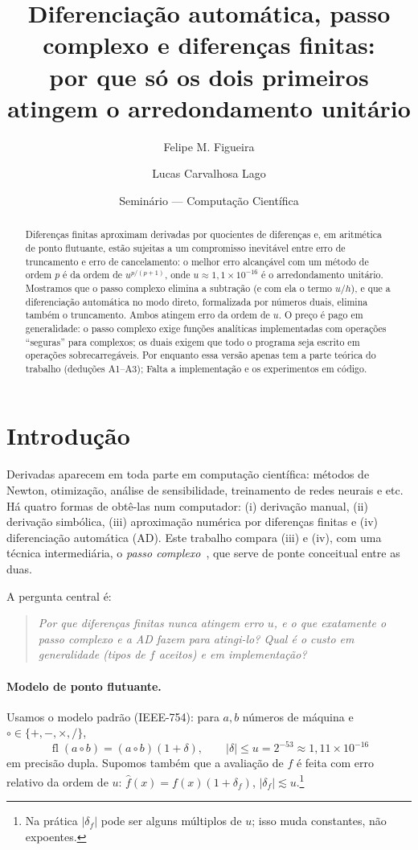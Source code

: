 \documentclass[11pt,a4paper]{article}
\title{Diferenciação automática, passo complexo e diferenças finitas:\\
\large por que só os dois primeiros atingem o arredondamento unitário\\[4pt] \normalsize }
\author{Felipe M. Figueira \and Lucas Carvalhosa Lago}
\date{\small Seminário --- Computação Científica}
\newcommand{\fl}{\operatorname{fl}}
\begin{document}
\maketitle

\begin{abstract}
Diferenças finitas aproximam derivadas por quocientes de diferenças e, em aritmética de ponto flutuante, estão sujeitas a um compromisso inevitável entre erro de truncamento e erro de cancelamento: o melhor erro alcançável com um método de ordem $p$ é da ordem de $u^{p/(p+1)}$, onde $u\approx1{,}1\times10^{-16}$ é o arredondamento unitário. Mostramos que o passo complexo elimina a subtração (e com ela o termo $u/h$), e que a diferenciação automática no modo direto, formalizada por números duais, elimina também o truncamento. Ambos atingem erro da ordem de $u$. O preço é pago em generalidade: o passo complexo exige funções analíticas implementadas com operações ``seguras'' para complexos; os duais exigem que todo o programa seja escrito em operações sobrecarregáveis. Por enquanto essa versão apenas tem a parte teórica do trabalho (deduções A1--A3); Falta a implementação e os experimentos em código.
\end{abstract}

\tableofcontents

\section{Introdução}

Derivadas aparecem em toda parte em computação científica: métodos de Newton, otimização, análise de sensibilidade, treinamento de redes neurais e etc. Há quatro formas de obtê-las num computador: (i) derivação manual, (ii) derivação simbólica, (iii) aproximação numérica por diferenças finitas e (iv) diferenciação automática (AD). Este trabalho compara (iii) e (iv), com uma técnica intermediária, o \emph{passo complexo}~\cite{squire1998,martins2003}, que serve de ponte conceitual entre as duas.

A pergunta central é:

\begin{quote}
\emph{Por que diferenças finitas nunca atingem erro $u$, e o que exatamente o passo complexo e a AD fazem para atingi-lo? Qual é o custo em generalidade (tipos de $f$ aceitos) e em implementação?}
\end{quote}

\paragraph{Modelo de ponto flutuante.} Usamos o modelo padrão (IEEE-754): para $a,b$ números de máquina e $\circ\in\{+,-,\times,/\}$,
\begin{equation}
\fl(a\circ b) = (a\circ b)(1+\delta), \qquad |\delta|\le u = 2^{-53}\approx 1{,}11\times 10^{-16}
\end{equation}
em precisão dupla. Supomos também que a avaliação de $f$ é feita com erro relativo da ordem de $u$: $\hat f(x) = f(x)(1+\delta_f)$, $|\delta_f|\lesssim u$.\footnote{Na prática $|\delta_f|$ pode ser alguns múltiplos de $u$; isso muda constantes, não expoentes.}
\end{document}
